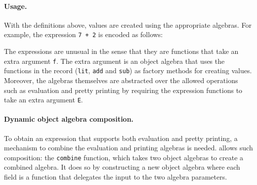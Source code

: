 \paragraph{Usage.}
With the definitions above, values are created using the
appropriate algebras. For example, the expression \lstinline{7 + 2} 
is encoded as follows:
\begin{comment}
  \begin{lstlisting}{language=F2J}
    let e1[E] (f: SubExpAlg[E]) = 
    f.add (f.lit 7) (f.lit 2);
  \end{lstlisting}
\end{comment}

\noindent The expressions are unusual in the sense that they are
functions that take an extra argument \lstinline$f$. The extra
argument is an object algebra that uses the functions in the record
(\lstinline$lit$, \lstinline$add$ and \lstinline$sub$) as factory
methods for creating values. Moreover, the algebras themselves are
abstracted over the allowed operations such as evaluation and pretty
printing by requiring the expression functions to take an extra
argument \lstinline$E$.

\paragraph{Dynamic object algebra composition.}
To obtain an expression that supports both evaluation and pretty
printing, a mechanism to combine the evaluation and printing
algebras is needed. \name allows such composition: the \lstinline$combine$
function, which takes two object algebras to create a combined algebra. It
does so by constructing a new object algebra where each field is a
function that delegates the input to the two algebra parameters.
\begin{comment}
  \begin{lstlisting}{language=F2J}
    let combine[A,B](f: ExpAlg[A])(g: ExpAlg[B]) : 
    ExpAlg[A&B] = {
      lit = \(x: Int) -> f.lit x ,, g.lit x,
      add = \(x: A & B) (y: A & B) ->
      f.add x y ,, g.add x y
    }
  \end{lstlisting}
\end{comment}

\begin{comment}
  \begin{lstlisting}{language=F2J}
    let newAlg = 
    combine[IEval,IPrint] subEvalAlg printAlg;
    let o = e1[IEval&IPrint] newAlg;
    o.print ++ " = " ++ o.eval.toString()
  \end{lstlisting}
\end{comment}

